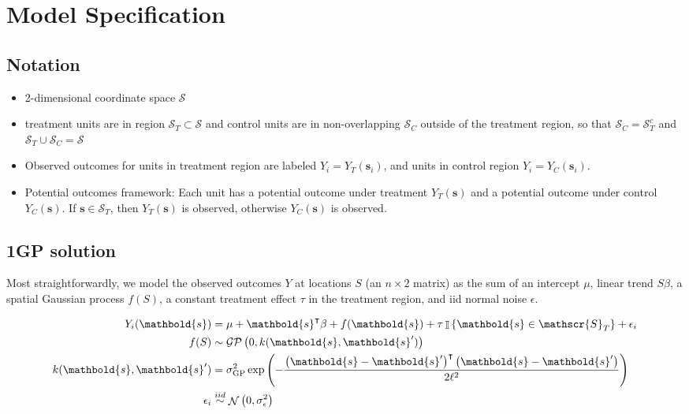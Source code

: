 \documentclass[letter]{article}
\providecommand{\tightlist}{%
      \setlength{\itemsep}{0pt}\setlength{\parskip}{0pt}}
\newcommand{\genericdel}[3]{%
      \left#1#3\right#2
    }
\newcommand{\del}[1]{\genericdel(){#1}}
\newcommand{\cbr}[1]{\genericdel\{\}{#1}}
\DeclareMathOperator{\Ind}{\mathbb{I}}
\DeclareMathOperator{\normal}{\mathcal{N}}
\newcommand{\gp}{\mathcal{GP}}
\newcommand{\trans}{^{\intercal}}
\newcommand{\scrS}{\mathscr{S}}
\newcommand{\sigmaf}{\sigma_{\mathrm{GP}}}
\newcommand{\svec}{\mathbold{s}}
\newcommand{\iid}{iid}
\providecommand{\tightlist}{%
  	  \setlength{\itemsep}{0pt}\setlength{\parskip}{0pt}}
\begin{document}
    	\section{Model Specification}\label{model-specification}

\subsection{Notation}\label{notation}

\begin{itemize}
\tightlist
\item
  2-dimensional coordinate space \(\scrS\)
\item
  treatment units are in region \(\scrS_T \subset \scrS\) and control
  units are in non-overlapping \(\scrS_C\) outside of the treatment
  region, so that \(\scrS_C = \scrS_T^c\) and
  \(\scrS_T \cup \scrS_C = \scrS\)
\item
  Observed outcomes for units in treatment region are labeled
  \(Y_i = Y_T(\svec_i)\), and units in control region
  \(Y_i = Y_C(\svec_i)\).
\item
  Potential outcomes framework: Each unit has a potential outcome under
  treatment \(Y_T(\svec)\) and a potential outcome under control
  \(Y_C(\svec)\). If \(\svec \in \scrS_T\), then \(Y_T(\svec)\) is
  observed, otherwise \(Y_C(\svec)\) is observed.
\end{itemize}

\subsection{1GP solution}\label{gp-solution}

Most straightforwardly, we model the observed outcomes \(Y\) at
locations \(S\) (an \(n \times 2\) matrix) as the sum of an intercept
\(\mu\), linear trend \(S\beta\), a spatial Gaussian process \(f(S)\), a
constant treatment effect \(\tau\) in the treatment region, and iid
normal noise \(\epsilon\).

\begin{equation}\begin{split}
Y_i(\svec) &= \mu+\svec\trans\beta + f(\svec) + \tau \Ind\cbr{\svec \in \scrS_T} + \epsilon_i \\
f(S) &\sim \gp\del{0, k(\svec, \svec')} \\
k(\svec,\svec') &= \sigmaf^2 \exp\del{ - \frac{\del{\svec-\svec'}\trans\del{\svec-\svec'}}{2 \ell^2}} \\
\epsilon_i &\overset{\iid}{\sim} \normal\del{0,\sigma_\epsilon^2}
\end{split}\end{equation}
\end{document}
